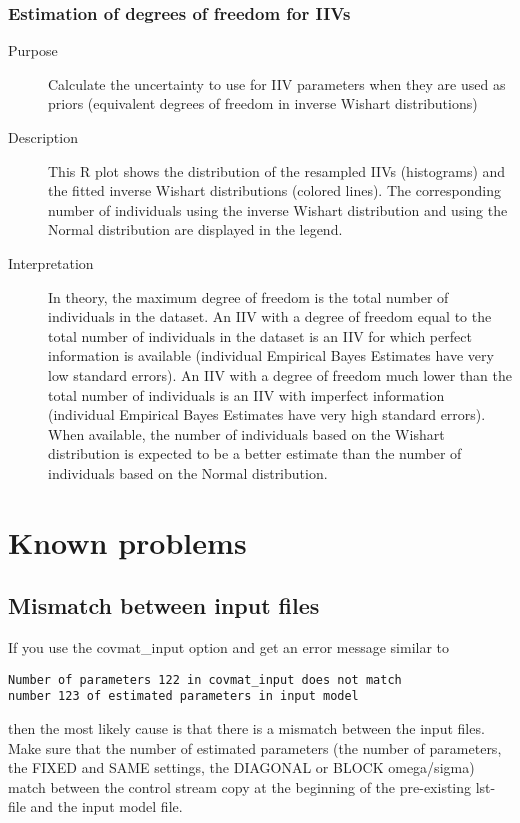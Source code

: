 \subsubsection{Estimation of degrees of freedom for IIVs}
\begin{description}
\item[Purpose] Calculate the uncertainty to use for IIV parameters when they are used as priors (equivalent degrees of freedom in inverse Wishart distributions) 
\item[Description] This R plot shows the distribution of the resampled IIVs (histograms) and the fitted inverse Wishart distributions (colored lines). The corresponding number of individuals using the inverse Wishart distribution and using the Normal distribution are displayed in the legend.
\item[Interpretation] In theory, the maximum degree of freedom is the total number of individuals in the dataset. An IIV with a degree of freedom equal to the total number of individuals in the dataset is an IIV for which perfect information is available (individual Empirical Bayes Estimates have very low standard errors). An IIV with a degree of freedom much lower than the total number of individuals is an IIV with imperfect information (individual Empirical Bayes Estimates have very high standard errors). When available, the number of individuals based on the Wishart distribution is expected to be a better estimate than the number of individuals based on the Normal distribution.
\end{description}

\section{Known problems}
\subsection*{Mismatch between input files}
If you use the covmat\_input option and get an error message similar to
\begin{verbatim}
Number of parameters 122 in covmat_input does not match
number 123 of estimated parameters in input model
\end{verbatim}
then the most likely cause is that there is a mismatch between the input files. Make sure that the number of estimated parameters (the number of parameters, the FIXED and SAME settings, the DIAGONAL or BLOCK omega/sigma) match between the control stream copy at the beginning of the pre-existing lst-file and the input model file.

